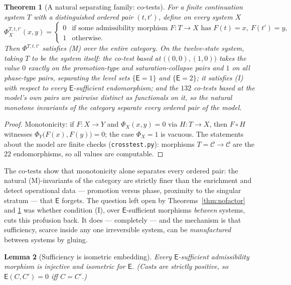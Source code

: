 \documentclass[11pt]{article}
\newtheorem{theorem}{Theorem}[section]
\newtheorem{lemma}[theorem]{Lemma}
\theoremstyle{remark}
\newcommand{\C}{\mathcal{C}}
\newcommand{\E}{\mathsf{E}}
\begin{document}
\begin{theorem}[A natural separating family: co-tests]
\label{thm:cotest}
For a finite continuation system $T$ with a distinguished ordered pair
$(t,t')$, define on every system $X$
\[
\Phi^{T,t,t'}_{X}(x,y) =
\begin{cases}
0 & \text{if some admissibility morphism } F\colon T\to X
\text{ has } F(t)=x,\ F(t')=y,\\
1 & \text{otherwise.}
\end{cases}
\]
Then $\Phi^{T,t,t'}$ satisfies (M) over the entire category. On the
twelve-state system, taking $T$ to be the system itself: the co-test
based at $\bigl((0,0),(1,0)\bigr)$ takes the value $0$ exactly on the
promotion-type and saturation-collapse pairs and $1$ on all
phase-type pairs, separating the level sets $\{\E=1\}$ and
$\{\E=2\}$; it satisfies (I) with respect to every $\E$-sufficient
endomorphism; and the $132$ co-tests based at the model's own pairs
are pairwise distinct as functionals on it, so the natural monotone
invariants of the category separate \emph{every} ordered pair of the
model.
\end{theorem}

\begin{proof}
Monotonicity: if $F\colon X\to Y$ and $\Phi_{X}(x,y)=0$ via
$H\colon T\to X$, then $F\circ H$ witnesses
$\Phi_{Y}\bigl(F(x),F(y)\bigr)=0$; the case $\Phi_{X}=1$ is vacuous.
The statements about the model are finite checks
(\texttt{crosstest.py}): morphisms $T=\C\to\C$ are the $22$
endomorphisms, so all values are computable.
\end{proof}

The co-tests show that monotonicity alone separates every ordered
pair: the natural (M)-invariants of the category are strictly finer
than the enrichment and detect operational data --- promotion versus
phase, proximity to the singular stratum --- that $\E$ forgets. The
question left open by Theorems~\ref{thm:nofactor} and
\ref{thm:cotest} was whether condition (I), over $\E$-sufficient
morphisms \emph{between} systems, cuts this profusion back. It does
--- completely --- and the mechanism is that sufficiency, scarce
inside any one irreversible system, can be \emph{manufactured}
between systems by gluing.

\begin{lemma}[Sufficiency is isometric embedding]\label{lem:embed}
Every $\E$-sufficient admissibility morphism is injective and
isometric for $\E$. (Costs are strictly positive, so
$\E(C,C')=0$ iff $C=C'$.)
\end{lemma}
\end{document}
